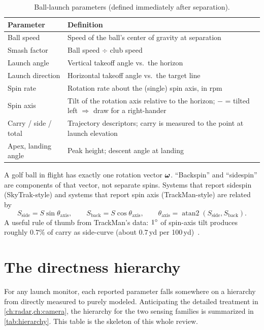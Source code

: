 \begin{table}[htbp]
\centering\small
\caption{Ball-launch parameters (defined immediately after separation).}
\label{tab:ballparams}
\begin{tabular}{@{}p{3.2cm}p{10.8cm}@{}}
\toprule
\textbf{Parameter} & \textbf{Definition} \\
\midrule
Ball speed & Speed of the ball's center of gravity at separation \\
Smash factor & Ball speed $\div$ club speed \\
Launch angle & Vertical takeoff angle vs.\ the horizon \\
Launch direction & Horizontal takeoff angle vs.\ the target line \\
Spin rate & Rotation rate about the (single) spin axis, in rpm \\
Spin axis & Tilt of the rotation axis relative to the horizon;
  $-$ = tilted left $\Rightarrow$ draw for a right-hander \\
Carry / side / total & Trajectory descriptors; carry is measured to the
  point at launch elevation \\
Apex, landing angle & Peak height; descent angle at landing \\
\bottomrule
\end{tabular}
\end{table}

A golf ball in flight has exactly one rotation vector
$\bm{\omega}$. ``Backspin'' and ``sidespin'' are components of that
vector, not separate spins. Systems that report sidespin (SkyTrak-style)
and systems that report spin axis (TrackMan-style) are related by
\begin{equation}
\label{eq:spincomponents}
S_{\mathrm{side}} = S \sin\theta_{\mathrm{axis}}, \qquad
S_{\mathrm{back}} = S \cos\theta_{\mathrm{axis}}, \qquad
\theta_{\mathrm{axis}} = \operatorname{atan2}\!\left(
  S_{\mathrm{side}}, S_{\mathrm{back}}\right).
\end{equation}
A useful rule of thumb from TrackMan's data: $1\si{\degree}$ of spin-axis tilt
produces roughly $0.7\%$ of carry as side-curve (about
$0.7$\,yd per 100\,yd)~\cite{perfectgolfswing}.

\section{The directness hierarchy}
\label{sec:hierarchy}

For any launch monitor, each reported parameter falls somewhere on a
hierarchy from directly measured to purely modeled. Anticipating the
detailed treatment in \cref{ch:radar,ch:camera}, the hierarchy for the two
sensing families is summarized in \cref{tab:hierarchy}. This table is the
skeleton of this whole review.

